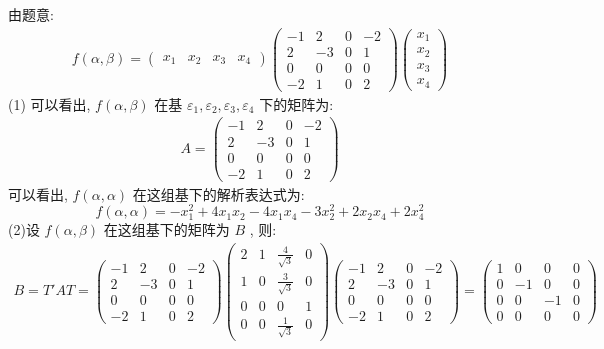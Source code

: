 \documentclass[11pt,a4paper,openany,oneside]{book}
\begin{document}
由题意:
\begin{gather*}
f(\alpha, \beta) = 
\begin{pmatrix}
x_1  &  x_2  &  x_3  &  x_4
\end{pmatrix}
\begin{pmatrix}
-1 &  2  &  0  &  -2  \\
2  & -3  &  0  &  1  \\
0  &  0  &  0  &  0  \\
-2 &  1  &  0  &  2
\end{pmatrix}
\begin{pmatrix}
x_1 \\ x_2 \\ x_3 \\ x_4
\end{pmatrix}
\end{gather*}
(1) 可以看出,  $ f(\alpha, \beta) $ 在基 $ \varepsilon_1, \varepsilon_2, \varepsilon_3, \varepsilon_4 $ 下的矩阵为:
\begin{gather*}
A =
\begin{pmatrix}
-1 &  2  &  0  &  -2  \\
2  & -3  &  0  &  1  \\
0  &  0  &  0  &  0  \\
-2 &  1  &  0  &  2
\end{pmatrix}
\end{gather*}
可以看出,  $ f(\alpha, \alpha) $ 在这组基下的解析表达式为:
 $$  f(\alpha, \alpha) = -x_1^2 + 4x_1x_2 - 4x_1x_4 - 3x_2^2 +2x_2x_4 + 2x_4^2  $$ 
(2)设 $ f(\alpha, \beta) $ 在这组基下的矩阵为 $ B $ , 则:
\begin{gather*}
B = T'AT =
\begin{pmatrix}
-1 &  2  &  0  &  -2  \\
2  & -3  &  0  &  1  \\
0  &  0  &  0  &  0  \\
-2 &  1  &  0  &  2
\end{pmatrix}
\begin{pmatrix}
2  &  1  &  \tfrac{4}{\sqrt{3}} &  0  \\
1  &  0  &  \tfrac{3}{\sqrt{3}} &  0  \\
0  &  0  &  0  &  1  \\
0  &  0  &  \tfrac{1}{\sqrt{3}} & 0
\end{pmatrix}
\begin{pmatrix}
-1 &  2  &  0  &  -2  \\
2  & -3  &  0  &  1  \\
0  &  0  &  0  &  0  \\
-2 &  1  &  0  &  2
\end{pmatrix} =
\begin{pmatrix}
1  &  0  &  0  &  0  \\
0  & -1  &  0  &  0  \\
0  &  0  & -1  &  0  \\
0  &  0  &  0  &  0
\end{pmatrix}
\end{gather*}
\end{document}
